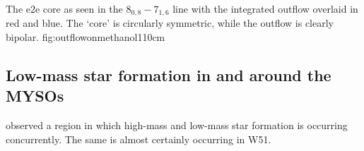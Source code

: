 \documentclass{aa}
\begin{document}
{The e2e core as seen in the \methanol $8_{0,8}-7_{1,6}$ line with
the integrated \twelveco outflow overlaid in red and blue.  The `core'
is circularly symmetric, while the outflow is clearly bipolar.}
{fig:outflowonmethanol}{1}{10cm}








%
%


\subsection{Low-mass star formation in and around the MYSOs}
\citet[TODO: Cyganowski 2016a][]{Cyganowski2016a} observed a region in which
high-mass and low-mass star formation is occurring concurrently.  The same
is almost certainly occurring in W51.  
\end{document}
